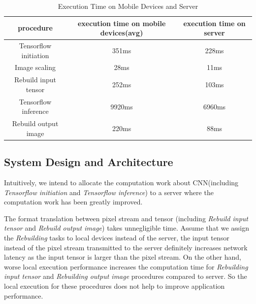 \documentclass[a4paper,11pt,onecolumn,twoside]{article}
\begin{document}
\begin{CJK*}{GBK}{song}

\begin{table}[H]
  \centering
  \caption{Execution Time on Mobile Devices and Server}\label{tb:1}
  \begin{tabular}{ccc}
    \hline
    procedure & execution time on mobile devices(avg) & execution time on server\\
    \hline
    Tensorflow initiation & 351ms & 228ms\\
    
    Image scaling & 28ms & 11ms\\
    
    Rebuild input tensor & 252ms & 103ms\\
    
    Tensorflow inference & 9920ms & 6960ms\\
    
    Rebuild output image & 220ms & 88ms\\
    \hline
  \end{tabular}
\end{table}



\subsection{System Design and Architecture}

Intuitively, we intend to allocate the computation
work about CNN(including \textit{Tensorflow initiation}
and \textit{Tensorflow inference}) 
to a server where 
the computation work has been greatly improved.

The format translation between pixel stream and tensor
(including \textit{Rebuild input tensor} and 
\textit{Rebuild output image})
takes unnegligible time. 
Assume that we assign the \textit{Rebuilding} tasks 
to local devices instead of the server, 
the input tensor instead of the pixel stream transmitted
to the server definitely increases network latency as the
input tensor is larger than the pixel stream. 
On the other hand, worse local execution performance increases
the computation time for \textit{Rebuilding input tensor}
and \textit{Rebuilding output image} procedures compared to 
server. So the local execution for these procedures does not 
help to improve application performance.


\end{CJK*}
\end{document}
